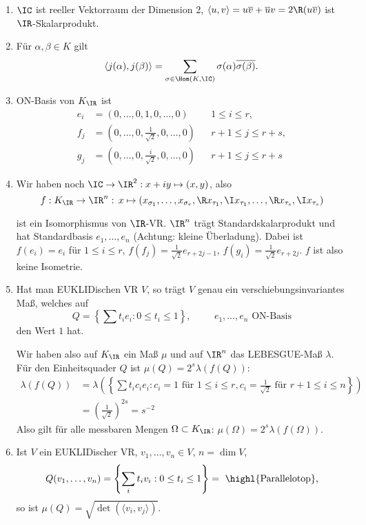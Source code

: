    \begin{Bemerkung}
    \begin{enumerate}
     \item $\IC$ ist reeller Vektorraum der Dimension $2$, $\langle u,v\rangle=u\overline v+ \overline uv=2\R(u\overline v)$ ist $\IR$-Skalarprodukt.
     \item Für $\alpha,\beta\in K$ gilt
     \[ \langle j(\alpha),j(\beta)\rangle=\sum_{\sigma\in\Hom(K,\IC)}\sigma(\alpha)\overline{\sigma(\beta)}.\]
     \item ON-Basis von $K_\IR$ ist 
     \begin{align*}
      e_i&=(0,\ldots,0,1,0,\ldots,0) && 1\leq i\leq r,\\
      f_j&=(0,\ldots,0,\tfrac{1}{\sqrt 2},0,\ldots,0) && r+1\leq j\leq r+s,\\
      g_j&=(0,\ldots,0,\tfrac{i}{\sqrt 2},0,\ldots,0) && r+1\leq j\leq r+s
     \end{align*}
      \item Wir haben noch $\IC\rightarrow\IR^2: x+iy\mapsto (x,y)$, also \[f:K_\IR\rightarrow\IR^n:\, x\mapsto (x_{\sigma_1},\ldots,x_{\sigma_r},\R x_{\tau_1},\I x_{\tau_1},\ldots,\R x_{\tau_s},\I x_{\tau_s})\]
   
      ist ein Isomorphismus von $\IR$-VR. $\IR^n$ trägt Standardskalarprodukt und hat Standardbasis $e_1,\ldots,e_n$ (Achtung: kleine Überladung). Dabei ist $f(e_i)=e_i$ für $1\leq i\leq r$, $f(f_j)=\frac{1}{\sqrt{2}}e_{r+2j-1}$,
      $f(g_i)=\frac{1}{\sqrt{2}} e_{r+2j}$. $f$ ist also keine Isometrie.
   
   \item Hat man EUKLIDischen VR $V$, so trägt $V$ genau ein verschiebungsinvariantes Maß, welches auf \[Q=\left\{\sum t_ie_i: 0\leq t_i \leq 1\right\},\hspace{1cm} e_1,\ldots,e_n \text{ ON-Basis}\] 
   den Wert $1$ hat.
   
   Wir haben also auf $K_\IR$ ein Maß $\mu$ und auf $\IR^n$ das LEBESGUE-Maß $\lambda$. Für den Einheitsquader $Q$ ist $\mu(Q)=2^s\lambda(f(Q))$:
   \begin{align*}
    \lambda(f(Q))&=\lambda\left(\left\{\sum t_ic_ie_i : c_i=1 \mbox{ für }1\leq i\leq r, c_i=\tfrac{1}{\sqrt 2}\mbox{ für } r+1\leq i\leq n\right\}\right)\\
    &=\left(\frac{1}{\sqrt 2}\right)^{2s}=s^{-2}
   \end{align*}
    Also gilt für alle messbaren Mengen $\Omega\subset K_\IR$: $\mu(\Omega)=2^s\lambda(f(\Omega))$.
    
    \item Ist $V$ ein EUKLIDischer VR, $v_1,\ldots,v_n\in V$, $n=\dim V$, \[Q(v_1,\ldots,v_n)=\left\{\sum_i t_i v_i: 0\leq t_i\leq 1 \right\}= \text{ \highl{Parallelotop},}\] so ist $\mu(Q)=\sqrt{\det(\langle v_i,v_j\rangle)}$.
    \end{enumerate}
   \end{Bemerkung}

